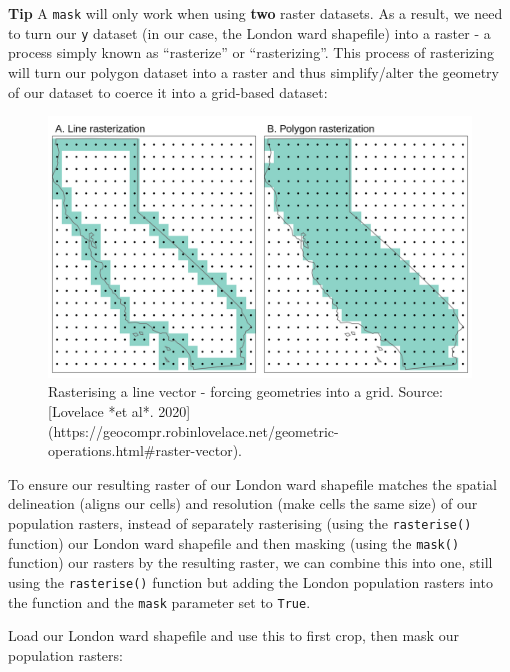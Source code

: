 \documentclass[
]{book}
\begin{document}
\textbf{Tip}
A \texttt{mask} will only work when using \textbf{two} raster datasets. As a result, we need to turn our \texttt{y} dataset (in our case, the London ward shapefile) into a raster - a process simply known as ``rasterize'' or ``rasterizing''. This process of rasterizing will turn our polygon dataset into a raster and thus simplify/alter the geometry of our dataset to coerce it into a grid-based dataset:

\begin{figure}

{\centering \includegraphics[width=18.67in]{images/w09/rtovector} 

}

\caption{Rasterising a line vector - forcing geometries into a grid. Source: [Lovelace *et al*. 2020](https://geocompr.robinlovelace.net/geometric-operations.html#raster-vector).}\label{fig:09-raster-as-grid}
\end{figure}

To ensure our resulting raster of our London ward shapefile matches the spatial delineation (aligns our cells) and resolution (make cells the same size) of our population rasters, instead of separately rasterising (using the \texttt{rasterise()} function) our London ward shapefile and then masking (using the \texttt{mask()} function) our rasters by the resulting raster, we can combine this into one, still using the \texttt{rasterise()} function but adding the London population rasters into the function and the \texttt{mask} parameter set to \texttt{True}.

Load our London ward shapefile and use this to first crop, then mask our population rasters:
\end{document}

